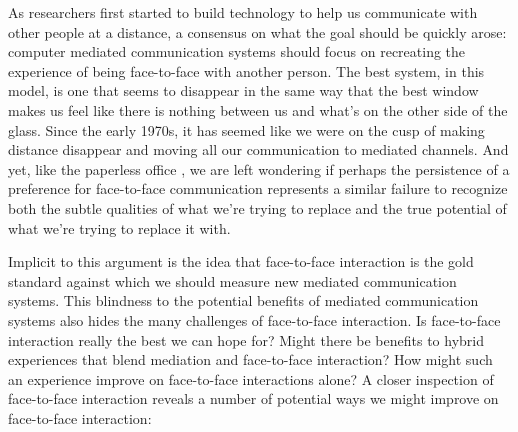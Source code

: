 \documentclass{tufte-handout}
\begin{document}


As researchers first started to build technology to help us communicate with other people at a distance, a consensus on what the goal should be quickly arose: computer mediated communication systems should focus on recreating the experience of being face-to-face with another person. The best system, in this model, is one that seems to disappear in the same way that the best window makes us feel like there is nothing between us and what's on the other side of the glass. Since the early 1970s, it has seemed like we were on the cusp of making distance disappear and moving all our communication to mediated channels. \citep{Egido:1988vq} And yet, like the paperless office \citep{Sellen:2001uk}, we are left wondering if perhaps the persistence of a preference for face-to-face communication represents a similar failure to recognize both the subtle qualities of what we're trying to replace and the true potential of what we're trying to replace it with. 

Implicit to this argument is the idea that face-to-face interaction is the gold standard against which we should measure new mediated communication systems. This blindness to the potential benefits of mediated communication systems also hides the many challenges of face-to-face interaction. Is face-to-face interaction really the best we can hope for? Might there be benefits to hybrid experiences that blend mediation and face-to-face interaction? How might such an experience improve on face-to-face interactions alone? A closer inspection of face-to-face interaction reveals a number of potential ways we might improve on face-to-face interaction:
\end{document}
